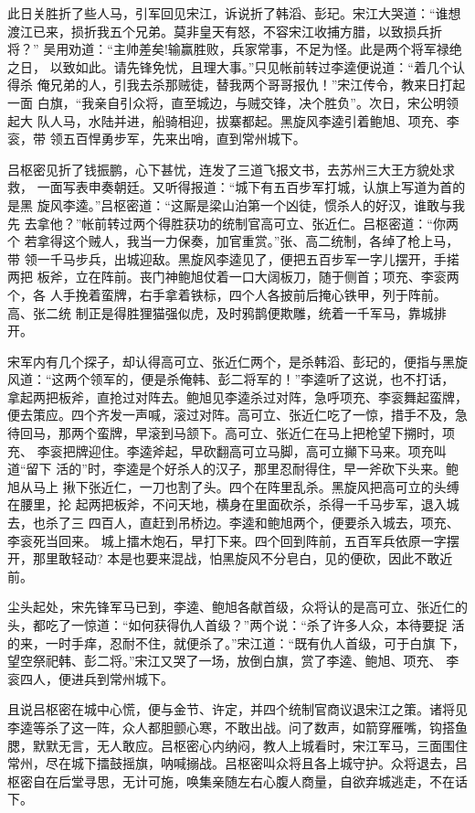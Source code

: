 此日关胜折了些人马，引军回见宋江，诉说折了韩滔、彭玘。宋江大哭道：“谁想
渡江已来，损折我五个兄弟。莫非皇天有怒，不容宋江收捕方腊，以致损兵折将？”
吴用劝道：“主帅差矣!输赢胜败，兵家常事，不足为怪。此是两个将军禄绝之日，
以致如此。请先锋免忧，且理大事。”只见帐前转过李逵便说道：“着几个认得杀
俺兄弟的人，引我去杀那贼徒，替我两个哥哥报仇！”宋江传令，教来日打起一面
白旗，“我亲自引众将，直至城边，与贼交锋，决个胜负”。次日，宋公明领起大
队人马，水陆并进，船骑相迎，拔寨都起。黑旋风李逵引着鲍旭、项充、李衮，带
领五百悍勇步军，先来出哨，直到常州城下。

吕枢密见折了钱振鹏，心下甚忧，连发了三道飞报文书，去苏州三大王方貌处求救，
一面写表申奏朝廷。又听得报道：“城下有五百步军打城，认旗上写道为首的是黑
旋风李逵。”吕枢密道：“这厮是梁山泊第一个凶徒，惯杀人的好汉，谁敢与我先
去拿他？”帐前转过两个得胜获功的统制官高可立、张近仁。吕枢密道：“你两个
若拿得这个贼人，我当一力保奏，加官重赏。”张、高二统制，各绰了枪上马，带
领一千马步兵，出城迎敌。黑旋风李逵见了，便把五百步军一字儿摆开，手掿两把
板斧，立在阵前。丧门神鲍旭仗着一口大阔板刀，随于侧首；项充、李衮两个，各
人手挽着蛮牌，右手拿着铁标，四个人各披前后掩心铁甲，列于阵前。高、张二统
制正是得胜狸猫强似虎，及时鸦鹊便欺雕，统着一千军马，靠城排开。

宋军内有几个探子，却认得高可立、张近仁两个，是杀韩滔、彭玘的，便指与黑旋
风道：“这两个领军的，便是杀俺韩、彭二将军的！”李逵听了这说，也不打话，
拿起两把板斧，直抢过对阵去。鲍旭见李逵杀过对阵，急呼项充、李衮舞起蛮牌，
便去策应。四个齐发一声喊，滚过对阵。高可立、张近仁吃了一惊，措手不及，急
待回马，那两个蛮牌，早滚到马颔下。高可立、张近仁在马上把枪望下搠时，项充、
李衮把牌迎住。李逵斧起，早砍翻高可立马脚，高可立攧下马来。项充叫道“留下
活的”时，李逵是个好杀人的汉子，那里忍耐得住，早一斧砍下头来。鲍旭从马上
揪下张近仁，一刀也割了头。四个在阵里乱杀。黑旋风把高可立的头缚在腰里，抡
起两把板斧，不问天地，横身在里面砍杀，杀得一千马步军，退入城去，也杀了三
四百人，直赶到吊桥边。李逵和鲍旭两个，便要杀入城去，项充、李衮死当回来。
城上擂木炮石，早打下来。四个回到阵前，五百军兵依原一字摆开，那里敢轻动?
本是也要来混战，怕黑旋风不分皂白，见的便砍，因此不敢近前。

尘头起处，宋先锋军马已到，李逵、鲍旭各献首级，众将认的是高可立、张近仁的
头，都吃了一惊道：“如何获得仇人首级？”两个说：“杀了许多人众，本待要捉
活的来，一时手痒，忍耐不住，就便杀了。”宋江道：“既有仇人首级，可于白旗
下，望空祭祀韩、彭二将。”宋江又哭了一场，放倒白旗，赏了李逵、鲍旭、项充、
李衮四人，便进兵到常州城下。

且说吕枢密在城中心慌，便与金节、许定，并四个统制官商议退宋江之策。诸将见
李逵等杀了这一阵，众人都胆颤心寒，不敢出战。问了数声，如箭穿雁嘴，钩搭鱼
腮，默默无言，无人敢应。吕枢密心内纳闷，教人上城看时，宋江军马，三面围住
常州，尽在城下擂鼓摇旗，呐喊搦战。吕枢密叫众将且各上城守护。众将退去，吕
枢密自在后堂寻思，无计可施，唤集亲随左右心腹人商量，自欲弃城逃走，不在话
下。


